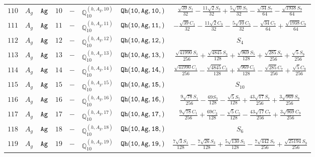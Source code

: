 \documentclass[fleqn,8pt]{jsarticle}
\begin{document}
\begin{table}[ht!]
\begin{center}
\begin{tabular}{cccccccc}
$ 110 $ & $ A_{g} $ & $ {\tt Ag} $ & $ 10 $ & $ - $ & $ \mathbb{Q}_{10}^{(h,A_{g},10)} $ & $ {\tt Qh(10,Ag,10,)} $ & $ \frac{\sqrt{39} S_{1}}{32} - \frac{11 \sqrt{2} S_{3}}{32} + \frac{5 \sqrt{10} S_{5}}{32} - \frac{\sqrt{34} S_{7}}{64} - \frac{\sqrt{1938} S_{9}}{64} $ \\
$ 111 $ & $ A_{g} $ & $ {\tt Ag} $ & $ 11 $ & $ - $ & $ \mathbb{Q}_{10}^{(h,A_{g},11)} $ & $ {\tt Qh(10,Ag,11,)} $ & $ - \frac{\sqrt{39} C_{1}}{32} - \frac{11 \sqrt{2} C_{3}}{32} - \frac{5 \sqrt{10} C_{5}}{32} - \frac{\sqrt{34} C_{7}}{64} + \frac{\sqrt{1938} C_{9}}{64} $ \\
$ 112 $ & $ A_{g} $ & $ {\tt Ag} $ & $ 12 $ & $ - $ & $ \mathbb{Q}_{10}^{(h,A_{g},12)} $ & $ {\tt Qh(10,Ag,12,)} $ & $ S_{4} $ \\
$ 113 $ & $ A_{g} $ & $ {\tt Ag} $ & $ 13 $ & $ - $ & $ \mathbb{Q}_{10}^{(h,A_{g},13)} $ & $ {\tt Qh(10,Ag,13,)} $ & $ \frac{\sqrt{41990} S_{1}}{256} + \frac{\sqrt{4845} S_{3}}{128} + \frac{\sqrt{969} S_{5}}{128} + \frac{\sqrt{285} S_{7}}{256} + \frac{\sqrt{5} S_{9}}{256} $ \\
$ 114 $ & $ A_{g} $ & $ {\tt Ag} $ & $ 14 $ & $ - $ & $ \mathbb{Q}_{10}^{(h,A_{g},14)} $ & $ {\tt Qh(10,Ag,14,)} $ & $ \frac{\sqrt{41990} C_{1}}{256} - \frac{\sqrt{4845} C_{3}}{128} + \frac{\sqrt{969} C_{5}}{128} - \frac{\sqrt{285} C_{7}}{256} + \frac{\sqrt{5} C_{9}}{256} $ \\
$ 115 $ & $ A_{g} $ & $ {\tt Ag} $ & $ 15 $ & $ - $ & $ \mathbb{Q}_{10}^{(h,A_{g},15)} $ & $ {\tt Qh(10,Ag,15,)} $ & $ S_{10} $ \\
$ 116 $ & $ A_{g} $ & $ {\tt Ag} $ & $ 16 $ & $ - $ & $ \mathbb{Q}_{10}^{(h,A_{g},16)} $ & $ {\tt Qh(10,Ag,16,)} $ & $ \frac{9 \sqrt{78} S_{1}}{256} - \frac{69 S_{3}}{128} - \frac{\sqrt{5} S_{5}}{128} + \frac{43 \sqrt{17} S_{7}}{256} + \frac{3 \sqrt{969} S_{9}}{256} $ \\
$ 117 $ & $ A_{g} $ & $ {\tt Ag} $ & $ 17 $ & $ - $ & $ \mathbb{Q}_{10}^{(h,A_{g},17)} $ & $ {\tt Qh(10,Ag,17,)} $ & $ \frac{9 \sqrt{78} C_{1}}{256} + \frac{69 C_{3}}{128} - \frac{\sqrt{5} C_{5}}{128} - \frac{43 \sqrt{17} C_{7}}{256} + \frac{3 \sqrt{969} C_{9}}{256} $ \\
$ 118 $ & $ A_{g} $ & $ {\tt Ag} $ & $ 18 $ & $ - $ & $ \mathbb{Q}_{10}^{(h,A_{g},18)} $ & $ {\tt Qh(10,Ag,18,)} $ & $ S_{6} $ \\
$ 119 $ & $ A_{g} $ & $ {\tt Ag} $ & $ 19 $ & $ - $ & $ \mathbb{Q}_{10}^{(h,A_{g},19)} $ & $ {\tt Qh(10,Ag,19,)} $ & $ \frac{7 \sqrt{3} S_{1}}{128} - \frac{7 \sqrt{26} S_{3}}{128} + \frac{5 \sqrt{130} S_{5}}{128} - \frac{7 \sqrt{442} S_{7}}{256} + \frac{\sqrt{25194} S_{9}}{256} $ \\

\end{tabular}
\end{center}
\end{table}
\end{document}
